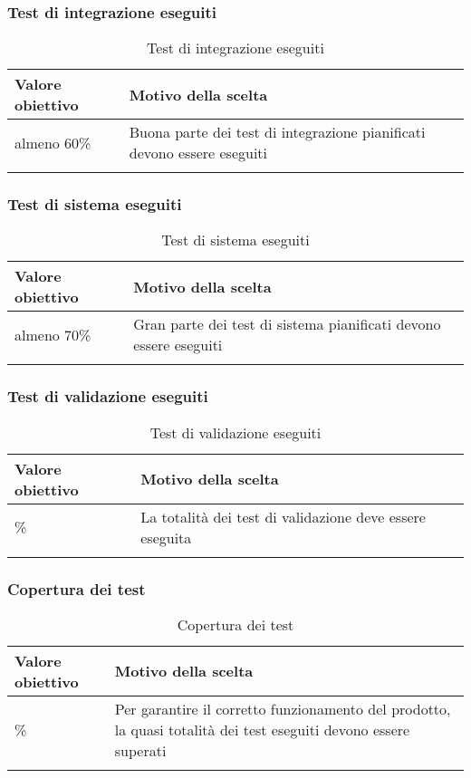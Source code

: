 \documentclass[../PianoDiQualifica_v4.0.0.tex]{subfiles}
\begin{document}
		\subsubsection{Test di integrazione eseguiti}
			\begin{longtable}[c] { >{\centering\arraybackslash}p{4cm} p{7cm} }
				\toprule
				\centerline{\textbf{Valore obiettivo}} & \centerline{\textbf{Motivo della scelta}} \\
				\midrule
					almeno 60\% & Buona parte dei test di integrazione pianificati devono essere eseguiti \\
				\bottomrule
				\caption{Test di integrazione eseguiti}
			\end{longtable}

		\subsubsection{Test di sistema eseguiti}
			\begin{longtable}[c] { >{\centering\arraybackslash}p{4cm} p{7cm} }
				\toprule
				\centerline{\textbf{Valore obiettivo}} & \centerline{\textbf{Motivo della scelta}} \\
				\midrule
					almeno 70\% & Gran parte dei test di sistema pianificati devono essere eseguiti\\
				\bottomrule
				\caption{Test di sistema eseguiti}
			\end{longtable}

		\subsubsection{Test di validazione eseguiti}
			\begin{longtable}[c] { >{\centering\arraybackslash}p{4cm} p{7cm} }
				\toprule
				\centerline{\textbf{Valore obiettivo}} & \centerline{\textbf{Motivo della scelta}} \\
				\midrule
					100\% &	La totalità dei test di validazione deve essere eseguita \\
				\bottomrule
				\caption{Test di validazione eseguiti}
			\end{longtable}

		\subsubsection{Copertura dei test}
			\begin{longtable}[c] { >{\centering\arraybackslash}p{4cm} p{7cm} }
				\toprule
				\centerline{\textbf{Valore obiettivo}} & \centerline{\textbf{Motivo della scelta}} \\
				\midrule
					90\% & Per garantire il corretto funzionamento del prodotto, la quasi totalità dei test eseguiti devono essere superati \\
				\bottomrule
				\caption{Copertura dei test}
			\end{longtable}
\end{document}
